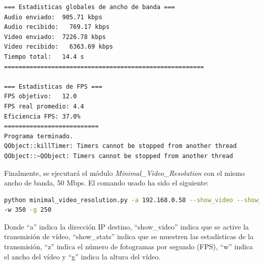 \begin{lstlisting}[language=bash,basicstyle=\ttfamily\scriptsize]
=== Estadisticas globales de ancho de banda ===
Audio enviado:	905.71 kbps
Audio recibido:   769.17 kbps
Video enviado:	7226.78 kbps
Video recibido:   6363.69 kbps
Tiempo total: 	14.4 s
=======================================================

=== Estadisticas de FPS ===
FPS objetivo: 	12.0
FPS real promedio: 4.4
Eficiencia FPS:	37.0%
==========================
Programa terminado.
QObject::killTimer: Timers cannot be stopped from another thread
QObject::~QObject: Timers cannot be stopped from another thread
\end{lstlisting}
\vspace{\baselineskip}

\newpage

Finalmente, se ejecutará el módulo \textit{Minimal\_Video\_Resolution} con el mismo ancho de banda, 50 Mbps. El comando usado ha sido el siguiente:

\begin{lstlisting}[language=bash,basicstyle=\ttfamily\scriptsize]
python minimal_video_resolution.py -a 192.168.0.58 --show_video --show_stats -z 12 \\
-w 350 -g 250
\end{lstlisting}
Donde ``a'' indica la dirección IP destino, ``show\_video'' indica que se active la transmisión de vídeo, ``show\_stats'' indica que se muestren las estadísticas de la transmisión, ``z'' indica el número de fotogramas por segundo (FPS), ``w'' indica el ancho del vídeo y ``g'' indica la altura del vídeo.
\vspace{\baselineskip}

